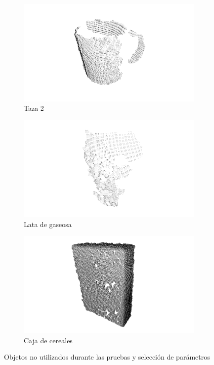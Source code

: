 \begin{figure}
	\centering
	\begin{subfigure}[b]{0.3\textwidth}
		\includegraphics[width=\textwidth]{img/obj_nuevos/coffee_mug_pcd.png}
		\caption{Taza 2}
	\end{subfigure}
	\quad
	\begin{subfigure}[b]{0.3\textwidth}
		\includegraphics[width=\textwidth]{img/obj_nuevos/soda_can_pcd.png}
		\caption{Lata de gaseosa}
	\end{subfigure}
	\quad
	\begin{subfigure}[b]{0.3\textwidth}
		\includegraphics[width=\textwidth]{img/obj_nuevos/cereal_box_pcd.png}
		\caption{Caja de cereales}
	\end{subfigure}

	\caption{Objetos no utilizados durante las pruebas y selección de parámetros}
	\label{new_objects}
\end{figure}


